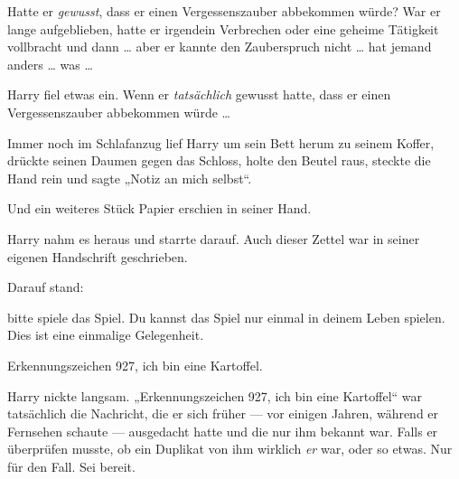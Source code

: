 Hatte er \emph{gewusst}, dass er einen Vergessenszauber abbekommen würde? War er lange aufgeblieben, hatte er irgendein Verbrechen oder eine geheime Tätigkeit vollbracht und dann … aber er kannte den Zauberspruch nicht … hat jemand anders … was …

Harry fiel etwas ein. Wenn er \emph{tatsächlich} gewusst hatte, dass er einen Vergessenszauber abbekommen würde …

Immer noch im Schlafanzug lief Harry um sein Bett herum zu seinem Koffer, drückte seinen Daumen gegen das Schloss, holte den Beutel raus, steckte die Hand rein und sagte
„Notiz an mich selbst“.

Und ein weiteres Stück Papier erschien in seiner Hand.

Harry nahm es heraus und starrte darauf. Auch dieser Zettel war in seiner eigenen Handschrift geschrieben.

Darauf stand:

\begin{writtenNote}

bitte spiele das Spiel. Du kannst das Spiel nur einmal in deinem Leben spielen. Dies ist eine einmalige Gelegenheit.

Erkennungszeichen 927, ich bin eine Kartoffel.

\end{writtenNote}

Harry nickte langsam.
„Erkennungszeichen 927, ich bin eine Kartoffel“ war tatsächlich die Nachricht, die er sich früher — vor einigen Jahren, während er Fernsehen schaute — ausgedacht hatte und die nur ihm bekannt war. Falls er überprüfen musste, ob ein Duplikat von ihm wirklich \emph{er} war, oder so etwas. Nur für den Fall. Sei bereit.

